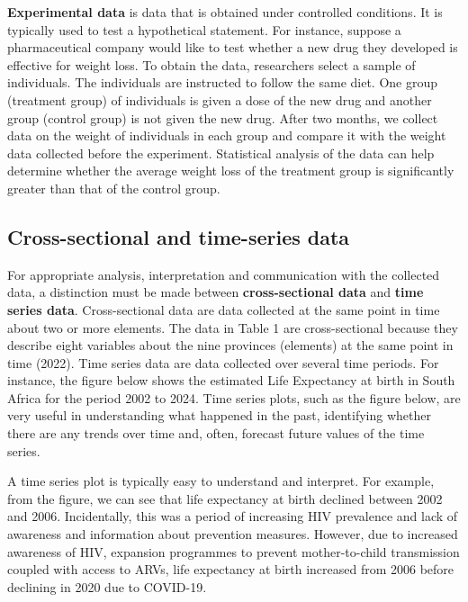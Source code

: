 \documentclass[
]{book}
\begin{document}
\textbf{Experimental data} is data that is obtained under controlled conditions. It is typically used to test a hypothetical statement. For instance, suppose a pharmaceutical company would like to test whether a new drug they developed is effective for weight loss. To obtain the data, researchers select a sample of individuals. The individuals are instructed to follow the same diet. One group (treatment group) of individuals is given a dose of the new drug and another group (control group) is not given the new drug. After two months, we collect data on the weight of individuals in each group and compare it with the weight data collected before the experiment. Statistical analysis of the data can help determine whether the average weight loss of the treatment group is significantly greater than that of the control group.~

\subsection{Cross-sectional and time-series data}\label{cross-sectional-and-time-series-data}

For appropriate analysis, interpretation and communication with the collected data, a distinction must be made between \textbf{cross-sectional data} and \textbf{time series data}. Cross-sectional data are data collected at the same point in time about two or more elements. The data in Table 1 are cross-sectional because they describe eight variables about the nine provinces (elements) at the same point in time (2022). Time series data are data collected over several time periods. For instance, the figure below shows the estimated Life Expectancy at birth in South Africa for the period 2002 to 2024. Time series plots, such as the figure below, are very useful in understanding what happened in the past, identifying whether there are any trends over time and, often, forecast future values of the time series.

A time series plot is typically easy to understand and interpret. For example, from the figure, we can see that life expectancy at birth declined between 2002 and 2006. Incidentally, this was a period of increasing HIV prevalence and lack of awareness and information about prevention measures. However, due to increased awareness of HIV, expansion programmes to prevent mother-to-child transmission coupled with access to ARVs, life expectancy at birth increased from 2006 before declining in 2020 due to COVID-19.~
\end{document}
